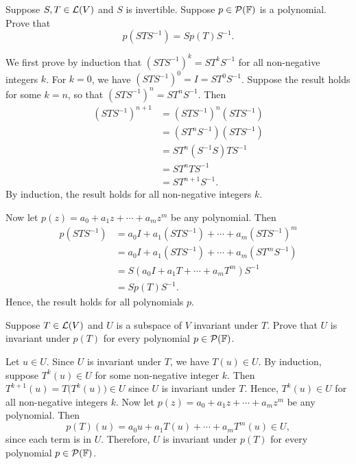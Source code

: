 \begin{exc}
\begin{exercise}
Suppose $S,T\in\mathcal{L}(V)$ and $S$ is invertible. Suppose $p\in\mathcal{P}(\mathbb{F})$ is a
polynomial. Prove that
\[ p(STS^{-1}) = Sp(T)S^{-1}. \]
\end{exercise}
\begin{solution}
We first prove by induction that $(STS^{-1})^k=ST^kS^{-1}$ for all
non-negative integers $k$. For $k=0$, we have $(STS^{-1})^0=I=ST^0S^{-1}$.
Suppose the result holds for some $k=n$, so that $(STS^{-1})^n=ST^nS^{-1}$.
Then
\begin{align*}
(STS^{-1})^{n+1} &= (STS^{-1})^n(STS^{-1})\\
  &= (ST^nS^{-1})(STS^{-1})\\
  &= ST^n(S^{-1}S)TS^{-1}\\
  &= ST^nTS^{-1}\\
  &= ST^{n+1}S^{-1}.
\end{align*}
By induction, the result holds for all non-negative integers $k$.

Now let $p(z)=a_0+a_1z+\cdots+a_mz^m$ be any polynomial. Then
\begin{align*}
p(STS^{-1}) &= a_0I+a_1(STS^{-1})+\cdots+a_m(STS^{-1})^m\\
  &= a_0I+a_1(STS^{-1})+\cdots+a_m(ST^mS^{-1})\\
  &= S(a_0I+a_1T+\cdots+a_mT^m)S^{-1}\\
  &= Sp(T)S^{-1}.
\end{align*}
Hence, the result holds for all polynomials $p$.
\end{solution}

\begin{exercise}
Suppose $T\in\mathcal{L}(V)$ and $U$ is a subspace of $V$ invariant under $T$. Prove
that $U$ is invariant under $p(T)$ for every polynomial $p\in\mathcal{P}(\mathbb{F})$.
\end{exercise}
\begin{solution}
Let $u\in U$. Since $U$ is invariant under $T$, we have $T(u)\in U$. By
induction, suppose $T^k(u)\in U$ for some non-negative integer $k$. Then
$T^{k+1}(u)=T\bigl(T^k(u)\bigr)\in U$ since $U$ is invariant under $T$. Hence,
$T^k(u)\in U$ for all non-negative integers $k$. Now let
$p(z)=a_0+a_1z+\cdots+a_mz^m$ be any polynomial. Then
\[ p(T)(u) = a_0u+a_1T(u)+\cdots+a_mT^m(u) \in U, \]
since each term is in $U$. Therefore, $U$ is invariant under $p(T)$ for every
polynomial $p\in\mathcal{P}(\mathbb{F})$.
\end{solution}


\end{exc}

